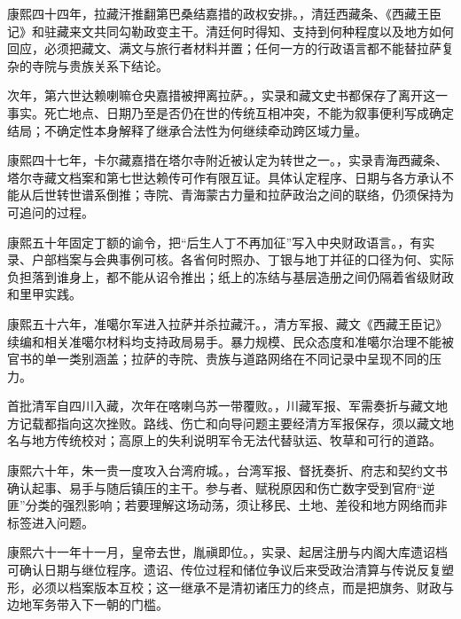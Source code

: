 康熙四十四年，拉藏汗推翻第巴桑结嘉措的政权安排。，清廷西藏条、《西藏王臣记》和驻藏来文共同勾勒政变主干。清廷何时得知、支持到何种程度以及地方如何回应，必须把藏文、满文与旅行者材料并置；任何一方的行政语言都不能替拉萨复杂的寺院与贵族关系下结论。

次年，第六世达赖喇嘛仓央嘉措被押离拉萨。，实录和藏文史书都保存了离开这一事实。死亡地点、日期乃至是否仍在世的传统互相冲突，不能为叙事便利写成确定结局；不确定性本身解释了继承合法性为何继续牵动跨区域力量。

康熙四十七年，卡尔藏嘉措在塔尔寺附近被认定为转世之一。，实录青海西藏条、塔尔寺藏文档案和第七世达赖传可作有限互证。具体认定程序、日期与各方承认不能从后世转世谱系倒推；寺院、青海蒙古力量和拉萨政治之间的联络，仍须保持为可追问的过程。

康熙五十年固定丁额的谕令，把“后生人丁不再加征”写入中央财政语言。，有实录、户部档案与会典事例可核。各省何时照办、丁银与地丁并征的口径为何、实际负担落到谁身上，都不能从诏令推出；纸上的冻结与基层造册之间仍隔着省级财政和里甲实践。

康熙五十六年，准噶尔军进入拉萨并杀拉藏汗。，清方军报、藏文《西藏王臣记》续编和相关准噶尔材料均支持政局易手。暴力规模、民众态度和准噶尔治理不能被官书的单一类别涵盖；拉萨的寺院、贵族与道路网络在不同记录中呈现不同的压力。

首批清军自四川入藏，次年在喀喇乌苏一带覆败。，川藏军报、军需奏折与藏文地方记载都指向这次挫败。路线、伤亡和向导问题主要经清方军报保存，须以藏文地名与地方传统校对；高原上的失利说明军令无法代替驮运、牧草和可行的道路。

康熙六十年，朱一贵一度攻入台湾府城。，台湾军报、督抚奏折、府志和契约文书确认起事、易手与随后镇压的主干。参与者、赋税原因和伤亡数字受到官府“逆匪”分类的强烈影响；若要理解这场动荡，须让移民、土地、差役和地方网络而非标签进入问题。

康熙六十一年十一月，皇帝去世，胤禛即位。，实录、起居注册与内阁大库遗诏档可确认日期与继位程序。遗诏、传位过程和储位争议后来受政治清算与传说反复塑形，必须以档案版本互校；这一继承不是清初诸压力的终点，而是把旗务、财政与边地军务带入下一朝的门槛。

